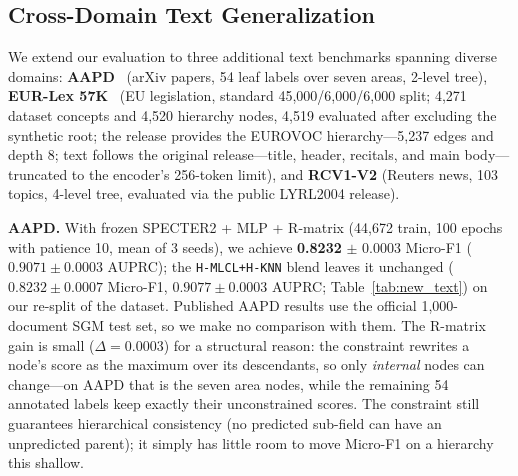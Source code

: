 \documentclass[preprint,12pt]{elsarticle}
\begin{document}
\subsection{Cross-Domain Text Generalization}

We extend our evaluation to three additional text benchmarks spanning diverse
domains: \textbf{AAPD}~\cite{aapd} (arXiv papers, 54 leaf labels over seven
areas, 2-level tree), \textbf{EUR-Lex 57K}~\cite{eurlex57k} (EU legislation,
standard 45{,}000/6{,}000/6{,}000 split; 4,271 dataset concepts and 4,520
hierarchy nodes, 4,519 evaluated after excluding the synthetic root; the release
provides the EUROVOC hierarchy---5,237 edges and depth 8; text follows the
original release---title, header, recitals, and main body---truncated to the
encoder's 256-token limit), and \textbf{RCV1-V2} (Reuters news, 103 topics,
4-level tree, evaluated via the public LYRL2004 release).

\begin{table}[htbp]
\centering
\caption{Micro-F1 on additional text HMC benchmarks (frozen SPECTER2 +
R; mean $\pm$ std over seeds 0/42/123). The official AAPD split is
53{,}840/1{,}000/1{,}000; our runs re-split all 55{,}840 documents
(44{,}672 train / 11{,}168 test, with 8{,}935 train documents held out for
validation), so no published baseline is like-for-like and none is listed. EUR-Lex uses the standard 45{,}000/6{,}000/6{,}000 split.}
\label{tab:new_text}
\small
{}
\end{table}

\textbf{AAPD.} With frozen SPECTER2 + MLP + R-matrix (44,672 train,
100 epochs with patience 10, mean of 3 seeds), we achieve
\textbf{0.8232} $\pm$ 0.0003 Micro-F1 ($0.9071 \pm 0.0003$ AUPRC); the
\texttt{H-MLCL+H-KNN} blend leaves it unchanged ($0.8232 \pm 0.0007$
Micro-F1, $0.9077 \pm 0.0003$ AUPRC;
Table~\ref{tab:new_text}) on our re-split of the dataset.  Published AAPD results use the
official 1,000-document SGM test set, so we make no comparison with
them. The R-matrix gain is small ($\Delta =
0.0003$) for a
structural reason: the constraint rewrites a node's score as the
maximum over its descendants, so only \emph{internal} nodes can
change---on AAPD that is the seven area nodes, while the remaining 54
annotated labels keep exactly their unconstrained scores. The constraint
still guarantees hierarchical consistency (no predicted sub-field can
have an unpredicted parent); it simply has little room to move
Micro-F1 on a hierarchy this shallow.
\end{document}
